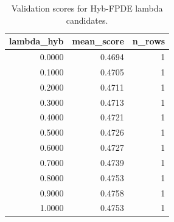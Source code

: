 \begin{table}[t]
\caption{Validation scores for Hyb-FPDE lambda candidates.}
\label{tab:lambda_distribution_computed}
\centering
\begin{tabular}{rrr}
\toprule
lambda\_hyb & mean\_score & n\_rows \\
\midrule
0.0000 & 0.4694 & 1 \\
0.1000 & 0.4705 & 1 \\
0.2000 & 0.4711 & 1 \\
0.3000 & 0.4713 & 1 \\
0.4000 & 0.4721 & 1 \\
0.5000 & 0.4726 & 1 \\
0.6000 & 0.4727 & 1 \\
0.7000 & 0.4739 & 1 \\
0.8000 & 0.4753 & 1 \\
0.9000 & 0.4758 & 1 \\
1.0000 & 0.4753 & 1 \\
\bottomrule
\end{tabular}

\end{table}
